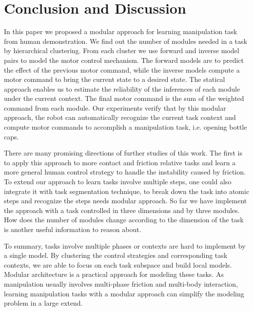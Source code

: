 \section{Conclusion and Discussion}
\label{sec:diss}
In this paper we proposed a modular approach for learning manipulation task from human demonstration. We find out the number of modules needed in a task by hierarchical clustering. From each cluster we use forward and inverse model pairs to model the motor control mechanism. The forward models are to predict the effect of the previous motor command, while the inverse models compute a motor command to bring the current state to a desired state. The statical approach enables us to estimate the reliability of the inferences of each module under the current context. The final motor command is the sum of the weighted command from each module. Our experiments verify that by this modular approach, the robot can automatically recognize the current task context and compute motor commands to accomplish a manipulation task, i.e. opening bottle caps.


There are many promising directions of further studies of this work. The first is to apply this approach to more contact and friction relative tasks and learn a more general human control strategy to handle the instability caused by friction. To extend our approach to learn tasks involve multiple steps, one could also integrate it with task segmentation technique, to break down the task into atomic steps and recognize the steps needs modular approach. So far we have implement the approach with a task controlled in three dimensions and by three modules. How does the number of modules change according to the dimension of the task is another useful information to reason about.

To summary, tasks involve multiple phases or contexts are hard to implement by a single model. By clustering the control strategies and corresponding task contexts, we are able to focus on each task subspace and build local models. Modular architecture is a practical approach for modeling these tasks. As manipulation usually involves multi-phase friction and multi-body interaction, learning manipulation tasks with a modular approach can simplify the modeling problem in a large extend.

